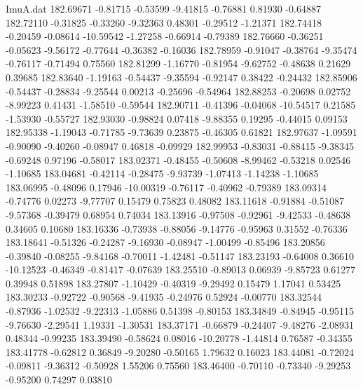 \begin{filecontents}{ImuA.dat}
 182.69671   -0.81715   -0.53599   -9.41815   -0.76881    0.81930   -0.64887
 182.72110   -0.31825   -0.33260   -9.32363    0.48301   -0.29512   -1.21371
 182.74418   -0.20459   -0.08614  -10.59542   -1.27258   -0.66914   -0.79389
 182.76660   -0.36251   -0.05623   -9.56172   -0.77644   -0.36382   -0.16036
 182.78959   -0.91047   -0.38764   -9.35474   -0.76117   -0.71494    0.75560
 182.81299   -1.16770   -0.81954   -9.62752   -0.48638    0.21629    0.39685
 182.83640   -1.19163   -0.54437   -9.35594   -0.92147    0.38422   -0.24432
 182.85906   -0.54437   -0.28834   -9.25544    0.00213   -0.25696   -0.54964
 182.88253   -0.20698    0.02752   -8.99223    0.41431   -1.58510   -0.59544
 182.90711   -0.41396   -0.04068  -10.54517    0.21585   -1.53930   -0.55727
 182.93030   -0.98824    0.07418   -9.88355    0.19295   -0.44015    0.09153
 182.95338   -1.19043   -0.71785   -9.73639    0.23875   -0.46305    0.61821
 182.97637   -1.09591   -0.90090   -9.40260   -0.08947    0.46818   -0.09929
 182.99953   -0.83031   -0.88415   -9.38345   -0.69248    0.97196   -0.58017
 183.02371   -0.48455   -0.50608   -8.99462   -0.53218    0.02546   -1.10685
 183.04681   -0.42114   -0.28475   -9.93739   -1.07413   -1.14238   -1.10685
 183.06995   -0.48096    0.17946  -10.00319   -0.76117   -0.40962   -0.79389
 183.09314   -0.74776    0.02273   -9.77707    0.15479    0.75823    0.48082
 183.11618   -0.91884   -0.51087   -9.57368   -0.39479    0.68954    0.74034
 183.13916   -0.97508   -0.92961   -9.42533   -0.48638    0.34605    0.10680
 183.16336   -0.73938   -0.88056   -9.14776   -0.95963    0.31552   -0.76336
 183.18641   -0.51326   -0.24287   -9.16930   -0.08947   -1.00499   -0.85496
 183.20856   -0.39840   -0.08255   -9.84168   -0.70011   -1.42481   -0.51147
 183.23193   -0.64008    0.36610  -10.12523   -0.46349   -0.81417   -0.07639
 183.25510   -0.89013    0.06939   -9.85723    0.61277    0.39948    0.51898
 183.27807   -1.10429   -0.40319   -9.29492    0.15479    1.17041    0.53425
 183.30233   -0.92722   -0.90568   -9.41935   -0.24976    0.52924   -0.00770
 183.32544   -0.87936   -1.02532   -9.22313   -1.05886    0.51398   -0.80153
 183.34849   -0.84945   -0.95115   -9.76630   -2.29541    1.19331   -1.30531
 183.37171   -0.66879   -0.24407   -9.48276   -2.08931    0.48344   -0.99235
 183.39490   -0.58624    0.08016  -10.20778   -1.44814    0.76587   -0.34355
 183.41778   -0.62812    0.36849   -9.20280   -0.50165    1.79632    0.16023
 183.44081   -0.72024   -0.09811   -9.36312   -0.50928    1.55206    0.75560
 183.46400   -0.70110   -0.73340   -9.29253   -0.95200    0.74297    0.03810

\end{filecontents}
